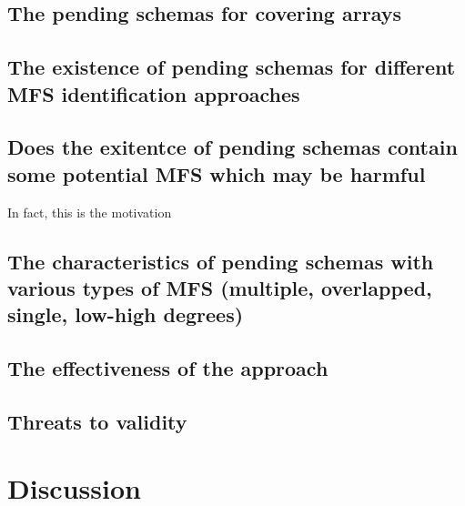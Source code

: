 {\subsection{The pending schemas for covering arrays}

%

\subsection{The existence of pending schemas for different MFS identification approaches}

%

\subsection{Does the exitentce of pending schemas contain some potential MFS which may be harmful}
In fact, this is the motivation


\subsection{The characteristics of pending schemas with various types of MFS (multiple, overlapped, single, low-high degrees)}



\subsection{The effectiveness of the approach}



\subsection{Threats to validity}


\section{Discussion}\label{sec:discussion}


}
